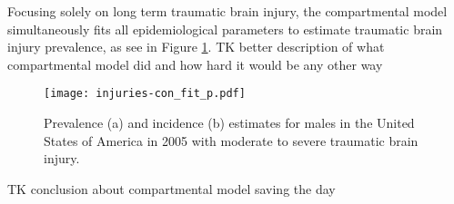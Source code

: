 Focusing solely on long term traumatic brain injury, the compartmental model simultaneously fits all epidemiological parameters to estimate traumatic brain injury
prevalence, as see in Figure \ref{fig:app-injury brain fit}.  TK better
description of what compartmental model did and how hard it would be any other way

    \begin{figure}[h]
        \begin{center}
            \texttt{[image: injuries-con\_fit\_p.pdf]}
            \caption{Prevalence (a) and incidence (b)
              estimates for males in the United States of America in
              2005 with moderate to severe traumatic brain injury.}
            \label{fig:app-injury brain fit}
        \end{center}
    \end{figure}

TK conclusion about compartmental model saving the day


